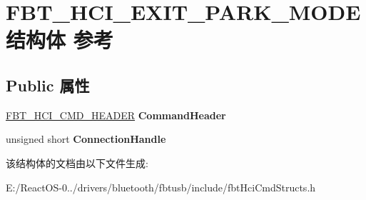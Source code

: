 \hypertarget{struct_f_b_t___h_c_i___e_x_i_t___p_a_r_k___m_o_d_e}{}\section{F\+B\+T\+\_\+\+H\+C\+I\+\_\+\+E\+X\+I\+T\+\_\+\+P\+A\+R\+K\+\_\+\+M\+O\+D\+E结构体 参考}
\label{struct_f_b_t___h_c_i___e_x_i_t___p_a_r_k___m_o_d_e}
\subsection*{Public 属性}
\begin{DoxyCompactItemize}
\item 
\mbox{\label{struct_f_b_t___h_c_i___e_x_i_t___p_a_r_k___m_o_d_e_afd1e6318a38654d5c0762ad10ff44f8b}} 
\hyperlink{struct_f_b_t___h_c_i___c_m_d___h_e_a_d_e_r}{F\+B\+T\+\_\+\+H\+C\+I\+\_\+\+C\+M\+D\+\_\+\+H\+E\+A\+D\+ER} {\bfseries Command\+Header}
\item 
\mbox{\label{struct_f_b_t___h_c_i___e_x_i_t___p_a_r_k___m_o_d_e_a9743e46a0e20bab1ea52a3b14105b1a7}} 
unsigned short {\bfseries Connection\+Handle}
\end{DoxyCompactItemize}


该结构体的文档由以下文件生成\+:\begin{DoxyCompactItemize}
\item 
E\+:/\+React\+O\+S-\/0../drivers/bluetooth/fbtusb/include/fbt\+Hci\+Cmd\+Structs.\+h\end{DoxyCompactItemize}
